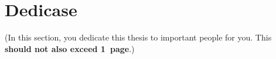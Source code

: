 \chapter*{Dedicase}

(In this section, you dedicate this thesis to important people for you. This \textbf{should not also exceed 1~page}.)